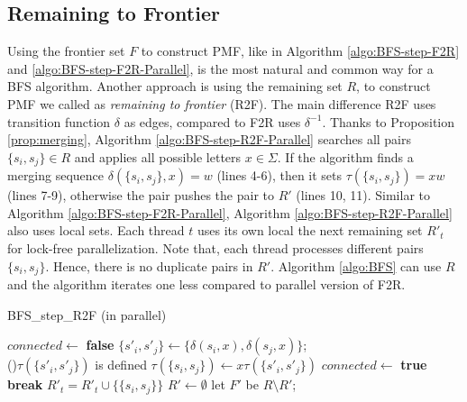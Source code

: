 \documentclass[12pt]{article}
\begin{document}
\subsection{Remaining to Frontier}
\label{sec:BFS-R2F-parallel}

Using the frontier set $F$ to construct PMF, like in Algorithm \ref{algo:BFS-step-F2R} and \ref{algo:BFS-step-F2R-Parallel}, is the most natural and common way for a BFS algorithm. Another approach is using the remaining set $R$, to construct PMF we called as \textit{remaining to frontier} (R2F). The main difference R2F uses transition function $\delta$ as edges, compared to F2R uses $\delta^{-1}$. Thanks to Proposition \ref{prop:merging}, Algorithm \ref{algo:BFS-step-R2F-Parallel} searches all pairs $\{ s_i,s_j \}\in R$ and applies all possible letters $x \in \Sigma$. If the algorithm finds a merging sequence $\delta(\{ s_i,s_j \}, x) = w$ (lines 4-6), then it sets $\tau(\{ s_i,s_j \}) = xw$ (lines 7-9), otherwise the pair pushes the pair to $R'$ (lines 10, 11). Similar to Algorithm \ref{algo:BFS-step-F2R-Parallel}, Algorithm \ref{algo:BFS-step-R2F-Parallel} also uses local sets. Each thread $t$ uses its own local the next remaining set $R'_t$ for lock-free parallelization. Note that, each thread processes different pairs $\{ s_i,s_j \}$. Hence, there is no duplicate pairs in $R'$. Algorithm \ref{algo:BFS} can use $R$ and the algorithm iterates one less compared to parallel version of F2R.

\begin{algorithm}[ht]
	\caption{BFS\_step\_R2F (in parallel)}
	\label{algo:BFS-step-R2F-Parallel}
	
	
		{
			$connected  \longleftarrow $ {\bf false}\;
			{
				$\{ s'_i, s'_j \}\longleftarrow \{ \delta(s_i,x),\delta(s_j,x) \}$; \\ 

				\If(){$\tau(\{ s'_i, s'_j \})$ is defined}
				{
					$\tau( \{ s_i, s_j\}) \longleftarrow x \tau(\{ s'_i, s'_j \})$\;
					$connected  \longleftarrow $ {\bf true}\;
					{\bf break}\;
				}
			}
			{
					$R'_t = R'_t \cup \{ \{ s_i, s_j \} \} $\;
			}
		}
		$R' \longleftarrow \emptyset$\;
	let $F'$ be $R \setminus R'$;
\end{algorithm}
\end{document}

